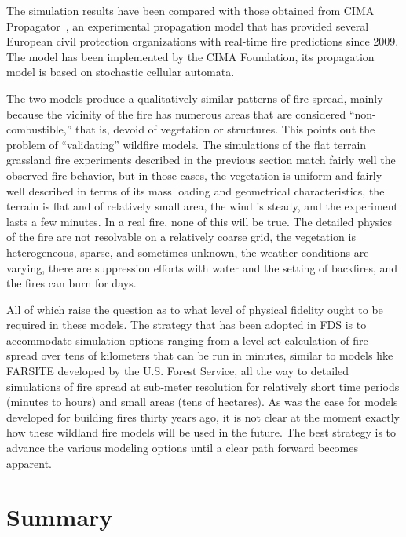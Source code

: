 \documentclass[journal,article,atmosphere,submit,moreauthors,pdftex]{Definitions_Review_Process/mdpi}
\begin{document}
The simulation results have been compared with those obtained from CIMA Propagator~\cite{Trucchia:2020}, an experimental propagation model that has provided several European civil protection organizations with real-time fire predictions since 2009. The model has been implemented by the CIMA Foundation, its propagation model is based on stochastic cellular automata.

The two models produce a qualitatively similar patterns of fire spread, mainly because the vicinity of the fire has numerous areas that are considered ``non-combustible,'' that is, devoid of vegetation or structures. This points out the problem of ``validating'' wildfire models. The simulations of the flat terrain grassland fire experiments described in the previous section match fairly well the observed fire behavior, but in those cases, the vegetation is uniform and fairly well described in terms of its mass loading and geometrical characteristics, the terrain is flat and of relatively small area, the wind is steady, and the experiment lasts a few minutes. In a real fire, none of this will be true. The detailed physics of the fire are not resolvable on a relatively coarse grid, the vegetation is heterogeneous, sparse, and sometimes unknown, the weather conditions are varying, there are suppression efforts with water and the setting of backfires, and the fires can burn for days.

All of which raise the question as to what level of physical fidelity ought to be required in these models. The strategy that has been adopted in FDS is to accommodate simulation options ranging from a level set calculation of fire spread over tens of kilometers that can be run in minutes, similar to models like FARSITE developed by the U.S. Forest Service, all the way to detailed simulations of fire spread at sub-meter resolution for relatively short time periods (minutes to hours) and small areas (tens of hectares). As was the case for models developed for building fires thirty years ago, it is not clear at the moment exactly how these wildland fire models will be used in the future. The best strategy is to advance the various modeling options until a clear path forward becomes apparent.


\section{Summary} \label{sec:summary}
\end{document}
